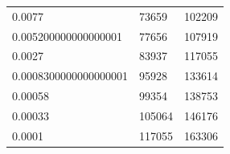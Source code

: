 \documentclass[]{exam}
\begin{document}
\begin{questions}
\begin{enumerate}[label=\arabic*.]
\begin{table}[]
\begin{tabular}{@{}lll@{}}
				0.0077                & 73659                    & 102209                     \\
				0.005200000000000001  & 77656                    & 107919                     \\
				0.0027                & 83937                    & 117055                     \\
				0.0008300000000000001 & 95928                    & 133614                     \\
				0.00058               & 99354                    & 138753                     \\
				0.00033               & 105064                   & 146176                     \\
				0.0001                & 117055                   & 163306                     \\
				\bottomrule 
			\end{tabular}
		\end{table}
\end{enumerate}

\newpage
\question
\hfill


\end{questions}
\end{document}
